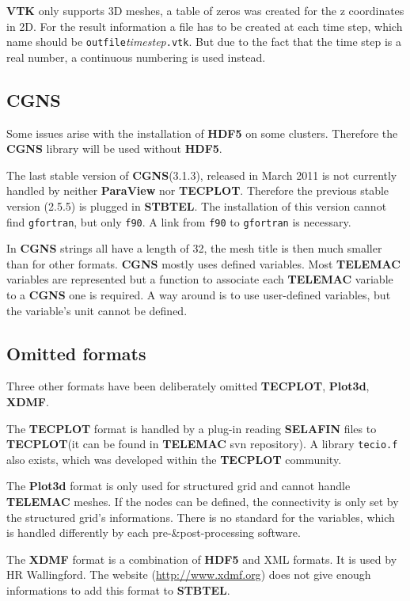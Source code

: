 \documentclass[a4paper,10pt]{article}
\newcommand{\tel}{\textbf{TELEMAC}\xspace}
\newcommand{\stb}{\textbf{STBTEL}\xspace}
\newcommand{\slf}{\textbf{SELAFIN}\xspace}
\newcommand{\vtk}{\textbf{VTK}\xspace}
\newcommand{\cgns}{\textbf{CGNS}\xspace}
\newcommand{\tecplot}{\textbf{TECPLOT}\xspace}
\newcommand{\hdf}{\textbf{HDF5}\xspace}
\begin{document}
\vtk only supports 3D meshes, a table of zeros was created for the z coordinates in 2D.
For the result information a file has to be created at each time step, which name should be 
\verb+outfile+\textit{timestep}\verb+.vtk+. But due to the fact that the time step is a real number, a continuous numbering is used instead. 

\subsection{\cgns}
Some issues arise with the installation of \hdf on some clusters.
Therefore the \cgns library will be used without \hdf. 

The last stable version of \cgns (3.1.3), released in March 2011 is not currently handled by neither \textbf{ParaView} nor \tecplot. Therefore
the previous stable version (2.5.5) is plugged in \stb. The installation of this version cannot find \verb+gfortran+, but only \verb+f90+. 
A link from \verb+f90+ to \verb+gfortran+ is necessary.

In \cgns strings all have a length of 32, the mesh title is then much smaller than for other formats.
\cgns mostly uses defined variables. Most \tel variables are represented but a function
to associate each \tel variable to a \cgns one is required. A way around is to use user-defined variables, but the variable's unit cannot be defined.



\subsection{Omitted formats}

Three other formats have been deliberately omitted \tecplot, \textbf{Plot3d}, \textbf{XDMF}.

The \tecplot format is handled by a plug-in reading \slf files
to \tecplot (it can be found in \tel svn repository). A library \verb+tecio.f+ also exists, which was developed within
the \tecplot community. 

The \textbf{Plot3d} format is only used for structured grid and cannot handle \tel meshes.
If the nodes can be defined, the connectivity is only set by the structured grid's informations.
There is no standard for the variables, which is handled differently by each pre-\&post-processing software.

The \textbf{XDMF} format is a combination of \hdf and XML formats.
It is used by HR Wallingford. The website (\url{http://www.xdmf.org}) does not 
give enough informations to add this format to \stb.
\end{document}
